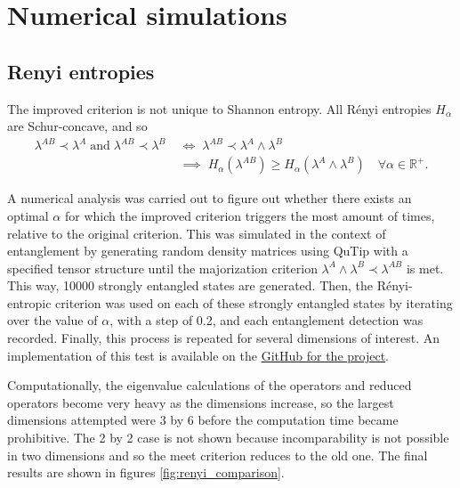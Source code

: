 \section{Numerical simulations}

\subsection{Renyi entropies}

The improved criterion is not unique to Shannon entropy. All Rényi entropies $H_\alpha$ are Schur-concave, and so
\begin{align}
    \lambda^{AB} \prec \lambda^A \; \text{and} \; \lambda^{AB} \prec \lambda^{B} \; &\iff \; \lambda^{AB} \prec \lambda^A \wedge \lambda^B \;\\ &\implies \; H_\alpha(\lambda^{AB}) \geq H_\alpha(\lambda^A \wedge \lambda^B) \quad \forall \alpha \in \mathbb{R}^+.
\end{align}

A numerical analysis was carried out to figure out whether there exists an optimal $\alpha$ for which the improved criterion triggers the most amount of times, relative to the original criterion. This was simulated in the context of entanglement by generating random density matrices using QuTip with a specified tensor structure until the majorization criterion $\lambda^A \wedge \lambda^B \prec \lambda^{AB}$ is met. This way, 10000 strongly entangled states are generated. Then, the Rényi-entropic criterion was used on each of these strongly entangled states by iterating over the value of $\alpha$, with a step of 0.2, and each entanglement detection was recorded. Finally, this process is repeated for several dimensions of interest. An implementation of this test is available on the \href{https://github.com/traaldbjerg/MajoLat}{GitHub for the project}.

Computationally, the eigenvalue calculations of the operators and reduced operators become very heavy as the dimensions increase, so the largest dimensions attempted were 3 by 6 before the computation time became prohibitive. The 2 by 2 case is not shown because incomparability is not possible in two dimensions and so the meet criterion reduces to the old one. The final results are shown in figures \ref{fig:renyi_comparison}.

